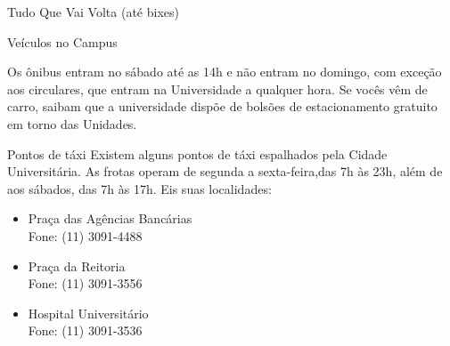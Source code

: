 \begin{secao}{Tudo Que Vai Volta (até bixes)}
\begin{subsecao}{Veículos no Campus}
\begin{itemize}
\end{itemize}

Os ônibus entram no sábado até as 14h e não entram no domingo, com exceção aos circulares, que entram na Universidade a qualquer hora. Se vocês vêm de carro, saibam que a universidade dispõe de bolsões de estacionamento
gratuito em torno das Unidades.

\end{subsecao}

\begin{subsecao}{Pontos de táxi}
Existem alguns pontos de táxi espalhados pela Cidade Universitária. As frotas
operam de segunda a sexta-feira,das 7h às 23h, além de aos sábados, das 7h às 17h.
Eis suas localidades:

\begin{itemize}
\item Praça das Agências Bancárias\\
Fone: (11) 3091-4488

\item Praça da Reitoria\\
Fone: (11) 3091-3556

\item Hospital Universitário\\
Fone: (11) 3091-3536
\end{itemize}
\end{subsecao}

\end{secao}
